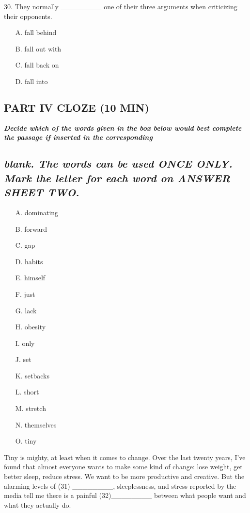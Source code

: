 \documentclass[UTF8,11pt]{ctexart}
\begin{document}
30. They normally \_\_\_\_\_\_\_\_ one of their three arguments when criticizing their opponents.


\begin{itemize}[leftmargin=2em,itemsep=.2em,topsep=.4em]\item[A.] fall behind
\item[B.] fall out with
\item[C.] fall back on
\item[D.] fall into
\end{itemize}

\subsection*{\textbf{PART IV CLOZE (10 MIN)}}


\textbf{\textit{Decide which of the words given in the box below would best complete the passage if inserted in the corresponding}}


\subsection*{\textbf{\textit{blank. The words can be used ONCE ONLY. Mark the letter for each word on ANSWER SHEET TWO.}}}


\begin{itemize}[leftmargin=2em,itemsep=.2em,topsep=.4em]\item[A.] dominating
\item[B.] forward
\item[C.] gap
\item[D.] habits
\item[E.] himself
\item[F.] just
\item[G.] lack
\item[H.] obesity
\item[I.] only
\item[J.] set
\item[K.] setbacks
\item[L.] short
\item[M.] stretch
\item[N.] themselves
\item[O.] tiny
\end{itemize}

Tiny is mighty, at least when it comes to change. Over the last twenty years, I’ve found that almost everyone wants to make some kind of change: lose weight, get better sleep, reduce stress. We want to be more productive and creative. But the alarming levels of (31) \_\_\_\_\_\_\_\_, sleeplessness, and stress reported by the media tell me there is a painful (32)\_\_\_\_\_\_\_\_ between what people want and what they actually do.
\end{document}
